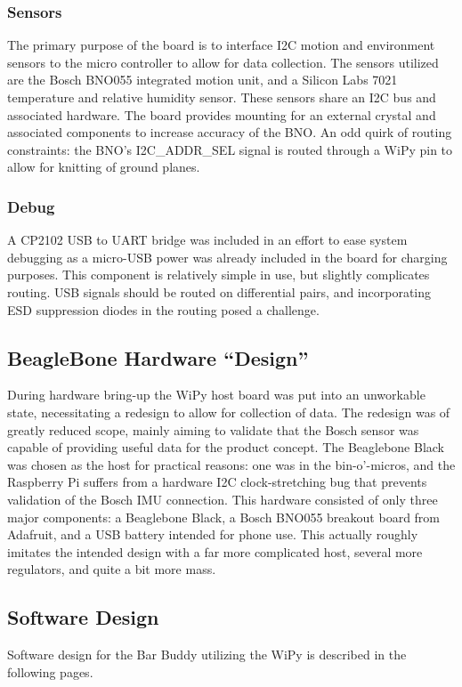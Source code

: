 \documentclass[11pt,oneside]{amsart}
\begin{document}
\subsubsection{Sensors}
The primary purpose of the board is to interface I2C motion and environment sensors to the micro controller to allow for data collection. The sensors utilized are the Bosch BNO055 integrated motion unit, and a Silicon Labs 7021 temperature and relative humidity sensor. These sensors share an I2C bus and associated hardware. The board provides mounting for an external crystal and associated components to increase accuracy of the BNO. An odd quirk of routing constraints: the BNO's I2C\_ADDR\_SEL signal is routed through a WiPy pin to allow for knitting of ground planes.
\subsubsection{Debug}
A CP2102 USB to UART bridge was included in an effort to ease system debugging as a micro-USB power was already included in the board for charging purposes. This component is relatively simple in use, but slightly complicates routing. USB signals should be routed on differential pairs, and incorporating ESD suppression diodes in the routing posed a challenge.
\subsection{BeagleBone Hardware ``Design''}
During hardware bring-up the WiPy host board was put into an unworkable state, necessitating a redesign to allow for collection of data. The redesign was of greatly reduced scope, mainly aiming to validate that the Bosch sensor was capable of providing useful data for the product concept. The Beaglebone Black was chosen as the host for practical reasons: one was in the bin-o'-micros, and the Raspberry Pi suffers from a hardware I2C clock-stretching bug that prevents validation of the Bosch IMU connection. This hardware consisted of only three major components: a Beaglebone Black, a Bosch BNO055 breakout board from Adafruit, and a USB battery intended for phone use. This actually roughly imitates the intended design with a far more complicated host, several more regulators, and quite a bit more mass.
\subsection{Software Design}
Software design for the Bar Buddy utilizing the WiPy is described in the following pages.

\end{document}
